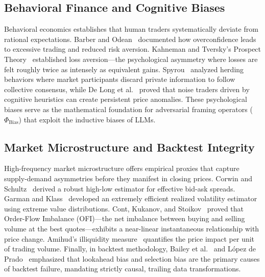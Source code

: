 \documentclass[11pt,a4paper]{article}
\begin{document}
\subsection{Behavioral Finance and Cognitive Biases}
Behavioral economics establishes that human traders systematically deviate from rational expectations. Barber and Odean~\cite{barber2001boys} documented how overconfidence leads to excessive trading and reduced risk aversion. Kahneman and Tversky's Prospect Theory~\cite{kahneman2013prospect} established loss aversion—the psychological asymmetry where losses are felt roughly twice as intensely as equivalent gains. Spyrou~\cite{spyrou2013herding} analyzed herding behaviors where market participants discard private information to follow collective consensus, while De Long et al.~\cite{delong1990noise} proved that noise traders driven by cognitive heuristics can create persistent price anomalies. These psychological biases serve as the mathematical foundation for adversarial framing operators ($\Phi_{\text{Bias}}$) that exploit the inductive biases of LLMs.

\subsection{Market Microstructure and Backtest Integrity}
High-frequency market microstructure offers empirical proxies that capture supply-demand asymmetries before they manifest in closing prices. Corwin and Schultz~\cite{corwin2012spread} derived a robust high-low estimator for effective bid-ask spreads. Garman and Klass~\cite{garman1980estimation} developed an extremely efficient realized volatility estimator using extreme value distributions. Cont, Kukanov, and Stoikov~\cite{cont2014price} proved that Order-Flow Imbalance (OFI)—the net imbalance between buying and selling volume at the best quotes—exhibits a near-linear instantaneous relationship with price change. Amihud's illiquidity measure~\cite{amihud2002illiquidity} quantifies the price impact per unit of trading volume. Finally, in backtest methodology, Bailey et al.~\cite{bailey2014probability} and López de Prado~\cite{lopezdeprado2018advances} emphasized that lookahead bias and selection bias are the primary causes of backtest failure, mandating strictly causal, trailing data transformations.
\end{document}
